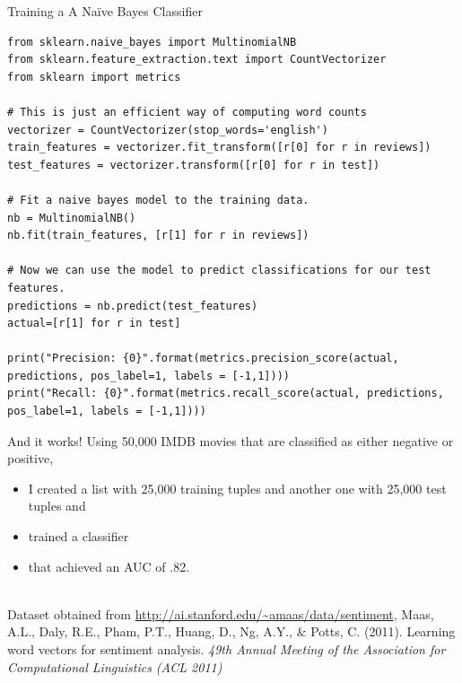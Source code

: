 \documentclass{beamer}
\begin{document}
\begin{frame}[fragile]{Training a A Naïve Bayes Classifier}
\begin{lstlisting}
from sklearn.naive_bayes import MultinomialNB
from sklearn.feature_extraction.text import CountVectorizer
from sklearn import metrics

# This is just an efficient way of computing word counts
vectorizer = CountVectorizer(stop_words='english')
train_features = vectorizer.fit_transform([r[0] for r in reviews])
test_features = vectorizer.transform([r[0] for r in test])

# Fit a naive bayes model to the training data.
nb = MultinomialNB()
nb.fit(train_features, [r[1] for r in reviews])

# Now we can use the model to predict classifications for our test features.
predictions = nb.predict(test_features)
actual=[r[1] for r in test]

print("Precision: {0}".format(metrics.precision_score(actual, predictions, pos_label=1, labels = [-1,1])))
print("Recall: {0}".format(metrics.recall_score(actual, predictions, pos_label=1, labels = [-1,1])))
\end{lstlisting}
\end{frame}
%


\begin{frame}{And it works!}
Using 50,000 IMDB movies that are classified as either negative or positive,
\begin{itemize}
\item I created a list with 25,000 training tuples and another one with 25,000 test tuples and
\item trained a classifier
\item that achieved an AUC of .82.
\end{itemize}
~\\
\tiny{Dataset obtained from \url{http://ai.stanford.edu/~amaas/data/sentiment}, Maas, A.L., Daly, R.E., Pham, P.T., Huang, D., Ng, A.Y., \& Potts, C. (2011). Learning word vectors for sentiment analysis. \emph{49th Annual Meeting of the Association for Computational Linguistics (ACL 2011)}
}

\end{frame}
\end{document}
